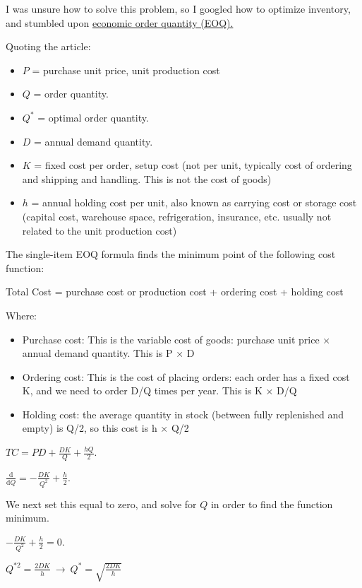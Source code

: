 \documentclass[]{article}
\providecommand{\tightlist}{%
  \setlength{\itemsep}{0pt}\setlength{\parskip}{0pt}}
\begin{document}
I was unsure how to solve this problem, so I googled how to optimize
inventory, and stumbled upon
\href{https://en.wikipedia.org/wiki/Economic_order_quantity}{economic
order quantity (EOQ).}

Quoting the article:

\begin{itemize}
\tightlist
\item
  \(P\) = purchase unit price, unit production cost
\item
  \(Q\) = order quantity.
\item
  \(Q^*\) = optimal order quantity.
\item
  \(D\) = annual demand quantity.
\item
  \(K\) = fixed cost per order, setup cost (not per unit, typically cost
  of ordering and shipping and handling. This is not the cost of goods)
\item
  \(h\) = annual holding cost per unit, also known as carrying cost or
  storage cost (capital cost, warehouse space, refrigeration, insurance,
  etc. usually not related to the unit production cost)
\end{itemize}

The single-item EOQ formula finds the minimum point of the following
cost function:

Total Cost = purchase cost or production cost + ordering cost + holding
cost

Where:

\begin{itemize}
\tightlist
\item
  Purchase cost: This is the variable cost of goods: purchase unit price
  × annual demand quantity. This is P × D
\item
  Ordering cost: This is the cost of placing orders: each order has a
  fixed cost K, and we need to order D/Q times per year. This is K × D/Q
\item
  Holding cost: the average quantity in stock (between fully replenished
  and empty) is Q/2, so this cost is h × Q/2
\end{itemize}

\(TC = PD + \frac{DK}{Q} + \frac{hQ}{2}\).

\(\frac{\text{d}}{\text{d}Q} = -\frac{DK}{Q^2} + \frac{h}{2}\).

We next set this equal to zero, and solve for \(Q\) in order to find the
function minimum.

\(-\frac{DK}{Q^2} + \frac{h}{2} = 0\).

\(Q^{*2} = \frac{2DK}{h} \ \to \ Q^* = \sqrt{\frac{2DK}{h}}\)
\end{document}
